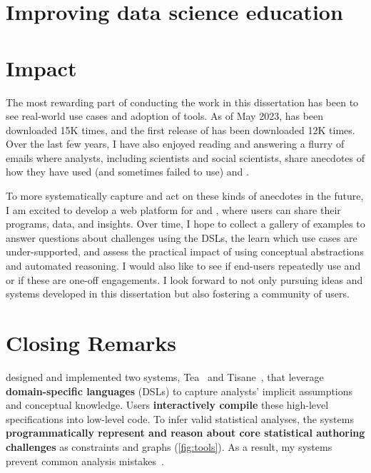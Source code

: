 \section{Improving data science education}


\section{Impact}
The most rewarding part of conducting the work in this dissertation has been to
see real-world use cases and adoption of tools. As of May 2023, \tea has been
downloaded 15K times, and the first release of \tisane has been downloaded 12K
times. Over the last few years, I have also enjoyed reading and answering a
flurry of emails where analysts, including scientists and social scientists,
share anecdotes of how they have used (and sometimes failed to use) \tea and
\tisane.


To more systematically capture and act on these kinds of anecdotes in the
future, I am excited to develop a web platform for \tea and \tisane, where users
can share their programs, data, and insights. Over time, I hope to collect a
gallery of examples to answer questions about challenges using the DSLs, the
learn which use cases are under-supported, and assess the practical impact of
using conceptual abstractions and automated reasoning. I would also like to see
if end-users repeatedly use \tea and \tisane or if these are one-off
engagements. I look forward to not only pursuing ideas and systems developed in
this dissertation but also fostering a community of users. 


\section{Closing Remarks}

designed and implemented two systems, Tea~\cite{jun2019tea} and
Tisane~\cite{jun2022tisane}, that leverage \textbf{domain-specific languages}
(DSLs) to capture analysts' implicit assumptions and conceptual knowledge. Users
\textbf{interactively compile} these high-level specifications into low-level
code. To infer valid statistical analyses, the systems \textbf{programmatically
represent and reason about core statistical authoring challenges} as constraints
and graphs (\autoref{fig:tools}).
As a result, my systems prevent common analysis
mistakes~\cite{jun2019tea,jun2022tisane}. 
